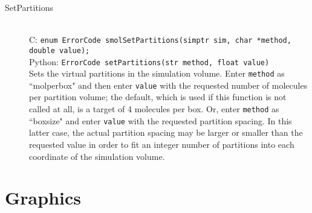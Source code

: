 \documentclass {book}
\begin{document}
\begin{description}
\item[SetPartitions]
\hfill \\
C: \texttt{enum ErrorCode smolSetPartitions(simptr sim, char *method, double value);}\\
Python: \texttt{ErrorCode setPartitions(str method, float value)}\\
Sets the virtual partitions in the simulation volume. Enter \texttt{method} as ``molperbox" and then enter \texttt{value} with the requested number of molecules per partition volume; the default, which is used if this function is not called at all, is a target of 4 molecules per box. Or, enter \texttt{method} as ``boxsize" and enter \texttt{value} with the requested partition spacing. In this latter case, the actual partition spacing may be larger or smaller than the requested value in order to fit an integer number of partitions into each coordinate of the simulation volume.

\end{description}

\section{Graphics}
\end{document}
